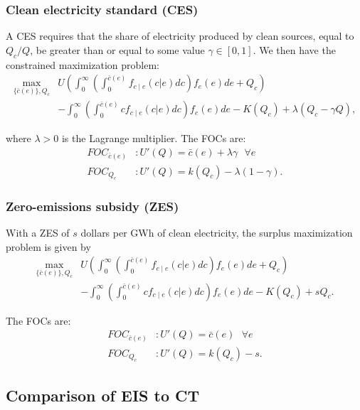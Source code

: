 \documentclass[12pt]{article}
\begin{document}
\subsubsection*{Clean electricity standard (CES)}

A CES requires that the share of electricity produced by clean sources, equal to $Q_c/Q$, be greater than or equal to some value $\gamma\in[0,1]$. We then have the constrained maximization problem:
\begin{align}
    \max_{\{\bar{c}(e)\},Q_c} & U\left(\int_0^\infty\left(\int_0^{\bar{c}(e)}f_{c\mid e}(c|e)dc\right)f_e(e)de + Q_c\right) \nonumber \\ 
    &- \int_0^\infty\left(\int_0^{\bar{c}(e)}cf_{c\mid e}(c|e)dc\right)f_e(e)de - K(Q_c) + \lambda(Q_c - \gamma Q), \label{appx:eq:CEmaxCES}
\end{align}

\noindent where $\lambda>0$ is the Lagrange multiplier. The FOCs are:
\begin{align}
    FOC_{\bar{c}(e)}&: U'(Q) = \bar{c}(e) + \lambda\gamma\text{  } \forall e \label{appx:eq:FOC_c_CES} \\
    FOC_{Q_c}&: U'(Q) = k(Q_c) - \lambda(1-\gamma). \label{appx:eq:FOC_Qc_CES}
\end{align}



\subsubsection*{Zero-emissions subsidy (ZES)}
With a ZES of $s$ dollars per GWh of clean electricity, the surplus maximization problem is given by
\begin{align}
    \max_{\{\bar{c}(e)\},Q_c} &U\left(\int_0^\infty\left(\int_0^{\bar{c}(e)}f_{c\mid e}(c|e)dc\right)f_e(e)de + Q_c\right) \nonumber \\  
    &- \int_0^\infty\left(\int_0^{\bar{c}(e)}cf_{c\mid e}(c|e)dc\right)f_e(e)de - K(Q_c) + sQ_c. \label{appx:eq:CEmaxZES}
\end{align}

The FOCs are:
\begin{align}
    FOC_{\bar{c}(e)}&: U'(Q) = \bar{c}(e)\text{  } \forall e \label{appx:eq:FOC_c_ZES} \\
    FOC_{Q_c}&: U'(Q) = k(Q_c)-s. \label{appx:eq:FOC_Qc_ZES}
\end{align}



\subsection*{Comparison of EIS to CT}
\end{document}
